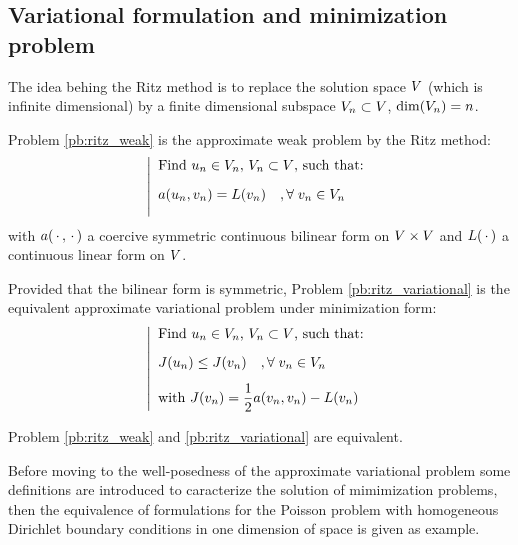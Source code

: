 \subsection{Variational formulation and minimization problem}

The idea behing the Ritz method is to replace the solution space ${V}$ (which is infinite dimensional) by a finite dimensional subspace ${V}_n \subset {V}$, $\dim({V}_n) = n$.

\medskip
Problem \eqref{pb:ritz_weak} is the approximate weak problem by the Ritz method:
\begin{equation}\label{pb:ritz_weak}
\left\lvert
\begin{array}{ll}
\mbox{Find $u_n \in {V}_n$, ${V}_n \subset {V}$, such that:}\\[2ex]
a( u_n, v_n ) = L(v_n)\quad,{\forall\;}  v_n \in {V}_n\\[2ex]
\end{array}
\right .
\end{equation}
with $a(\,{\mathbf\cdot}\,,\,{\mathbf\cdot}\,)$ a coercive symmetric continuous bilinear form on ${V}\times{V}$ and $L(\,{\mathbf\cdot}\,)$ a continuous linear form on ${V}$.

\medskip
Provided that the bilinear form is symmetric, Problem \eqref{pb:ritz_variational} is the equivalent approximate variational problem under minimization form:
\begin{equation}\label{pb:ritz_variational}
\left\lvert
\begin{array}{ll}
\mbox{Find $u_n \in {V}_n$, ${V}_n \subset {V}$, such that:}\\[2ex]
J(u_n) \leq J(v_n)\quad,{\forall\;}  v_n \in {V}_n\\[2ex]
\mbox{with $J(v_n) = \displaystyle\frac{1}{2} a(v_n,v_n) - L(v_n)$}
\end{array}
\right .
\end{equation}

\begin{prpstn}
Problem \ref{pb:ritz_weak} and \ref{pb:ritz_variational} are equivalent.
\end{prpstn}

\medskip
Before moving to the well-posedness of the approximate variational problem some definitions are introduced to caracterize the solution of mimimization problems, then the equivalence of formulations for the Poisson problem with homogeneous Dirichlet boundary conditions in one dimension of space is given as example.


